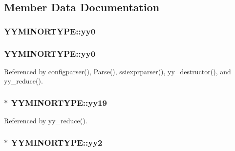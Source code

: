 \subsection{Member Data Documentation}
\hypertarget{unionYYMINORTYPE_a582dd50db316a7e16828158a72ac7bd3}{
\subsubsection[{yy0}]{ Y\-Y\-M\-I\-N\-O\-R\-T\-Y\-P\-E\-::yy0}}\label{unionYYMINORTYPE_a582dd50db316a7e16828158a72ac7bd3}
\hypertarget{unionYYMINORTYPE_a20e794c68d4bbfabc10b2c5d1c762d76}{
\subsubsection[{yy0}]{ Y\-Y\-M\-I\-N\-O\-R\-T\-Y\-P\-E\-::yy0}}\label{unionYYMINORTYPE_a20e794c68d4bbfabc10b2c5d1c762d76}


Referenced by configparser(), Parse(), ssiexprparser(), yy\-\_\-destructor(), and yy\-\_\-reduce().

\hypertarget{unionYYMINORTYPE_a4f4baa7c82918f20099a7914df3e1c14}{
\subsubsection[{yy19}]{$\ast$ Y\-Y\-M\-I\-N\-O\-R\-T\-Y\-P\-E\-::yy19}}\label{unionYYMINORTYPE_a4f4baa7c82918f20099a7914df3e1c14}


Referenced by yy\-\_\-reduce().

\hypertarget{unionYYMINORTYPE_a8d80600ec339fb93669f30e1235b1508}{
\subsubsection[{yy2}]{$\ast$ Y\-Y\-M\-I\-N\-O\-R\-T\-Y\-P\-E\-::yy2}}\label{unionYYMINORTYPE_a8d80600ec339fb93669f30e1235b1508}


